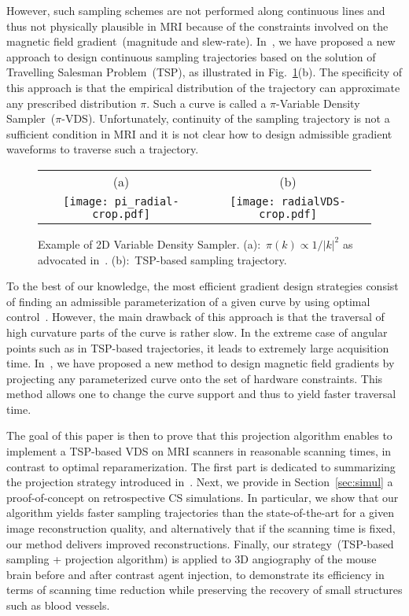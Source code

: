 \documentclass{article}
\begin{document}
However, such sampling schemes are not performed along continuous lines and thus not physically plausible in MRI because of the constraints involved on the magnetic field gradient~(magnitude and slew-rate). In~\cite{Chauffert13b}, we have proposed a new approach to design continuous sampling trajectories based on the solution of Travelling Salesman Problem~(TSP), as illustrated in Fig.~\ref{fig:introVDS}(b). The specificity of this approach is that the empirical distribution of the trajectory can approximate any prescribed distribution $\pi$. Such a curve is called a $\pi$-Variable Density Sampler~($\pi$-VDS). Unfortunately, continuity of the sampling trajectory is not a sufficient condition in MRI and it is not clear how to design admissible gradient waveforms to traverse such a trajectory.
\begin{figure}[!h]
\begin{center}
\begin{tabular}{cc}
(a)&(b)\\
\texttt{[image: pi\_radial-crop.pdf]}&
\texttt{[image: radialVDS-crop.pdf]}
\end{tabular}
\end{center}
\caption{\label{fig:introVDS} Example of 2D Variable Density Sampler. (a):~$\pi(k) \propto 1/|k|^2$ as advocated in~\cite{Chauffert14}. (b):~TSP-based sampling trajectory.\vspace{-.05 \linewidth}}
\end{figure}

To the best of our knowledge, the most efficient gradient design strategies consist of finding an admissible parameterization of a given curve by using optimal control~\cite{Lustig08,Vaziri13}. However, the main drawback of this approach is that the traversal of high curvature parts of the curve is rather slow. In the extreme case of angular points such as in TSP-based trajectories, it leads to extremely large acquisition time. In~\cite{Chauffert14b}, we have proposed a new method to design magnetic field gradients by projecting any parameterized curve onto the set of hardware constraints. This method allows one to change the curve support and thus to yield faster traversal time.

The goal of this paper is then to prove that this projection algorithm enables to implement a TSP-based VDS on MRI scanners in reasonable scanning times, in contrast to optimal reparamerization. The first part is dedicated to summarizing the projection strategy introduced in~\cite{Chauffert14b}. Next, we provide in Section~\ref{sec:simul} a proof-of-concept on retrospective CS simulations. In particular, we show that our algorithm yields faster sampling trajectories than the state-of-the-art for a given image reconstruction quality, and alternatively that if the scanning time is fixed, our method delivers improved reconstructions. Finally, our strategy~(TSP-based sampling + projection algorithm) is applied to 3D angiography of the mouse brain before and after contrast agent injection, to demonstrate its efficiency in terms of scanning time reduction while preserving the recovery of small structures such as blood vessels.
\end{document}
